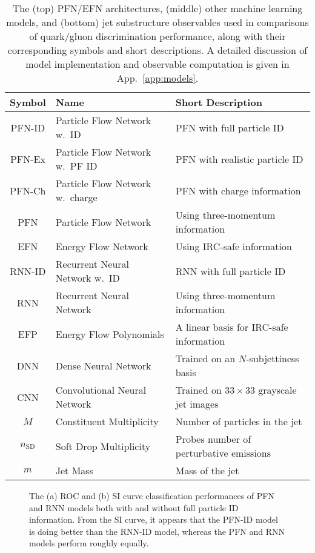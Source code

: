 \documentclass[letterpaper,11pt]{article}
\DeclareRobustCommand{\App}[1]{App.~\ref{#1}}
\begin{document}
\begin{table}[p]
\centering
\begin{tabular}{|c|l|l|}
\hline
 Symbol & Name &Short Description  \\ \hline \hline
PFN-ID &  Particle Flow Network w.\ ID & PFN with full particle ID  \\
PFN-Ex &  Particle Flow Network w.\ PF ID& PFN with realistic particle ID \\
PFN-Ch &  Particle Flow Network w.\ charge & PFN with charge information \\
PFN & Particle Flow Network & Using three-momentum information\\
EFN & Energy Flow Network & Using IRC-safe information\\
\hline
RNN-ID & Recurrent Neural Network w.\ ID & RNN with full particle ID \\
RNN & Recurrent Neural Network & Using three-momentum information \\
EFP & Energy Flow Polynomials & A linear basis for IRC-safe information \\
DNN & Dense Neural Network & Trained on an $N$-subjettiness basis \\
CNN & Convolutional Neural Network & Trained on $33\times 33$ grayscale jet images \\
\hline
$M$ & Constituent Multiplicity & Number of particles in the jet \\
$n_\text{SD}$ & Soft Drop Multiplicity & Probes number of perturbative emissions \\
$m$ & Jet Mass & Mass of the jet \\ \hline
\end{tabular}
\caption{
The (top) PFN/EFN architectures, (middle) other machine learning models, and (bottom) jet substructure observables used in comparisons of quark/gluon discrimination performance, along with their corresponding symbols and short descriptions.
%
A detailed discussion of model implementation and observable computation is given in \App{app:models}.}
\label{tab:obsandmodels}
\end{table}

\begin{figure}[p]
\centering
{}
\caption{
The (a) ROC and (b) SI curve classification performances of PFN and RNN models both with and without full particle ID information.
%
From the SI curve, it appears that the PFN-ID model is doing better than the RNN-ID model, whereas the PFN and RNN models perform roughly equally.}
\label{fig:qgroccomp2}
\end{figure}
\end{document}

